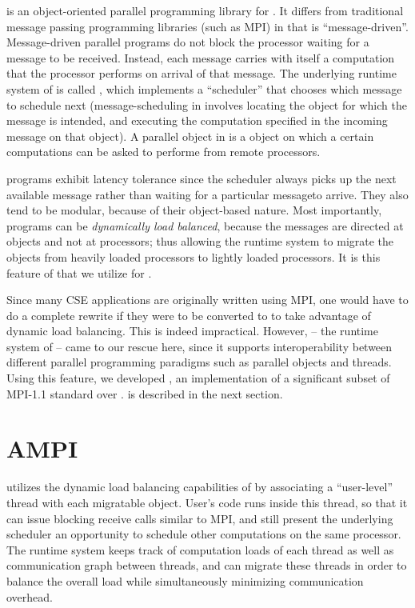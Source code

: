\documentclass[10pt]{article}
\begin{document}
\charmpp{} is an object-oriented parallel programming library for \CC{}.  It
differs from traditional message passing programming libraries (such as MPI) in
that \charmpp{} is ``message-driven''. Message-driven parallel programs do not
block the processor waiting for a message to be received.  Instead, each
message carries with itself a computation that the processor performs on
arrival of that message. The underlying runtime system of \charmpp{} is called
\converse{}, which implements a ``scheduler'' that chooses which message to
schedule next (message-scheduling in \charmpp{} involves locating the object
for which the message is intended, and executing the computation specified in
the incoming message on that object). A parallel object in \charmpp{} is a
\CC{} object on which a certain computations can be asked to performe from
remote processors.

\charmpp{} programs exhibit latency tolerance since the scheduler always picks
up the next available message rather than waiting for a particular messageto
arrive.  They also tend to be modular, because of their object-based nature.
Most importantly, \charmpp{} programs can be \emph{dynamically load balanced},
because the messages are directed at objects and not at processors; thus
allowing the runtime system to migrate the objects from heavily loaded
processors to lightly loaded processors. It is this feature of \charmpp{} that
we utilize for \ampi{}.

Since many CSE applications are originally written using MPI, one would have to
do a complete rewrite if they were to be converted to \charmpp{} to take
advantage of dynamic load balancing. This is indeed impractical. However,
\converse{} -- the runtime system of \charmpp{} -- came to our rescue here,
since it supports interoperability between different parallel programming
paradigms such as parallel objects and threads. Using this feature, we
developed \ampi{}, an implementation of a significant subset of MPI-1.1
standard over \charmpp{}.  \ampi{} is described in the next section.

\section{AMPI}

\ampi{} utilizes the dynamic load balancing capabilities of \charmpp{} by
associating a ``user-level'' thread with each \charmpp{} migratable object.
User's code runs inside this thread, so that it can issue blocking receive
calls similar to MPI, and still present the underlying scheduler an opportunity
to schedule other computations on the same processor. The runtime system keeps
track of computation loads of each thread as well as communication graph
between \ampi{} threads, and can migrate these threads in order to balance the
overall load while simultaneously minimizing communication overhead. 
\end{document}
